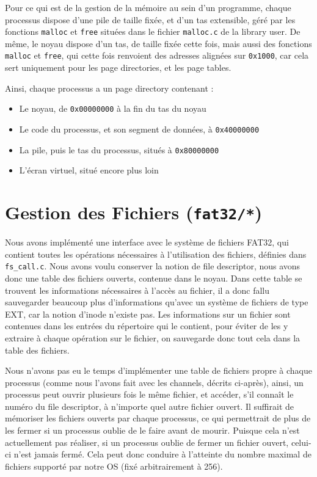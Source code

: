 \documentclass[a4paper,10pt, french]{article}
\newcommand{\code}[1]{\texttt{#1}}
\begin{document}
Pour ce qui est de la gestion de la mémoire au sein d'un programme, chaque processus dispose d'une pile de taille fixée, et d'un tas extensible,
géré par les fonctions \code{malloc} et \code{free} situées dans le fichier \code{malloc.c} de la library user.
De même, le noyau dispose d'un tas, de taille fixée cette fois, mais aussi des fonctions \code{malloc} et \code{free},
qui cette fois renvoient des adresses alignées sur \code{0x1000}, car cela sert uniquement pour les page directories, et les page tables.

Ainsi, chaque processus a un page directory contenant : 
\begin{itemize}
 \item Le noyau, de \code{0x00000000} à la fin du tas du noyau
 \item Le code du processus, et son segment de données, à \code{0x40000000}
 \item La pile, puis le tas du processus, situés à \code{0x80000000}
 \item L'écran virtuel, situé encore plus loin
\end{itemize}

\section{Gestion des Fichiers (\code{fat32/*})}
Nous avons implémenté une interface avec le système de fichiers FAT32, qui contient toutes les opérations
nécessaires à l'utilisation des fichiers, définies dans \code{fs\_call.c}.
Nous avons voulu conserver la notion de file descriptor, nous avons donc une table des fichiers ouverts, contenue 
dans le noyau. Dans cette table se trouvent les informations nécessaires à l'accès au fichier, il a donc fallu sauvegarder beaucoup 
plus d'informations qu'avec un système de fichiers de type EXT, car la notion d'inode n'existe pas.
Les informations sur un fichier sont contenues dans les entrées du répertoire qui le contient, pour éviter de les y
extraire à chaque opération sur le fichier, on sauvegarde donc tout cela dans la table des fichiers.

Nous n'avons pas eu le temps d'implémenter une table de fichiers propre à chaque processus (comme nous l'avons fait avec les
channels, décrits ci-après), ainsi, un processus peut ouvrir plusieurs fois le même fichier, et accéder, s'il connaît le numéro 
du file descriptor, à n'importe quel autre fichier ouvert. Il suffirait de mémoriser les fichiers ouverts par chaque processus,
ce qui permettrait de plus de les fermer si un processus oublie de le faire avant de mourir. Puisque cela
n'est actuellement pas réaliser, si un processus oublie de fermer un fichier ouvert, celui-ci n'est jamais fermé.
Cela peut donc conduire à l'atteinte du nombre maximal de fichiers supporté par notre OS (fixé arbitrairement à 256).
\end{document}
